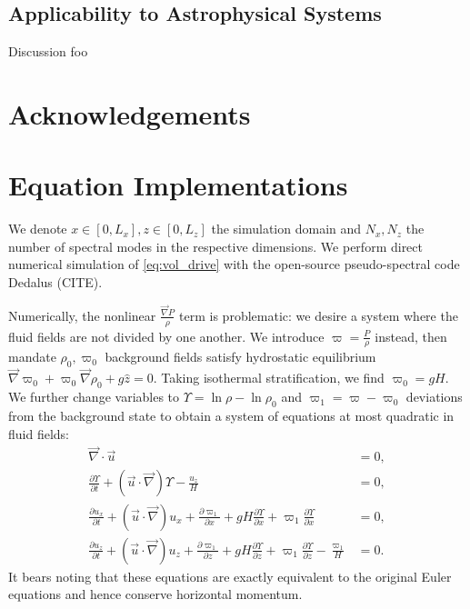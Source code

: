 \documentclass[
        fleqn,
        usenatbib,
    ]{mnras}
\newcommand*{\pd}[2]{\frac{\partial#1}{\partial#2}}
\newcommand*{\p}[1]{\left(#1\right)}
\begin{document}
\subsection{Applicability to Astrophysical Systems}


Discussion foo

\section{Acknowledgements}\label{s:ack}




\clearpage
\onecolumn
\appendix

\section{Equation Implementations}\label{ss:strat_impl}

We denote $x \in [0, L_x], z \in [0, L_z]$ the simulation domain and $N_x, N_z$
the number of spectral modes in the respective dimensions. We perform direct
numerical simulation of \autoref{eq:vol_drive} with the open-source
pseudo-spectral code Dedalus (CITE).

Numerically, the nonlinear $\frac{\vec{\nabla}P}{\rho}$ term is problematic: we
desire a system where the fluid fields are not divided by one another. We
introduce $\varpi = \frac{P}{\rho}$ instead, then mandate $\rho_0, \varpi_0$
background fields satisfy hydrostatic equilibrium $\vec{\nabla}\varpi_0 +
\varpi_0 \vec{\nabla}\rho_0 + g\hat{z} = 0$. Taking isothermal stratification,
we find $\varpi_0 = gH$. We further change variables to $\Upsilon = \ln \rho -
\ln \rho_0$ and $\varpi_1 = \varpi - \varpi_0$ deviations from the background
state to obtain a system of equations at most quadratic in fluid fields:
\begin{subequations}\label{se:nl_var}
    \begin{align}
        \vec{\nabla} \cdot \vec{u} &= 0,\\
        \pd{\Upsilon}{t} + \p{\vec{u} \cdot \vec{\nabla}} \Upsilon
            - \frac{u_z}{H} &= 0,\\
        \pd{u_x}{t} + \p{\vec{u} \cdot \vec{\nabla}}u_x
            + \pd{\varpi_1}{x} + gH\pd{\Upsilon}{x}
            + \varpi_1 \pd{\Upsilon}{x} &= 0,\\
        \pd{u_z}{t} + \p{\vec{u} \cdot \vec{\nabla}}u_z
            + \pd{\varpi_1}{z} + gH\pd{\Upsilon}{z}
            + \varpi_1 \pd{\Upsilon}{z} - \frac{\varpi_1}{H} &= 0.
    \end{align}
\end{subequations}
It bears noting that these equations are exactly equivalent to the original
Euler equations and hence conserve horizontal momentum.
\end{document}
